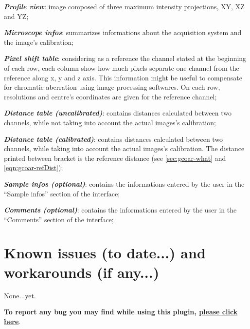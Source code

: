 \documentclass[a4paper, 11pt]{report}%
\makeatletter
\newcommand{\mailbug}{\begin{center}\textbf{To report any bug you may find while using this plugin, \href{mailto:fabrice.cordelieres@gmail.com,cedric.matthews@ibdml.univ-mrs.fr ?subject=Bug\%20found\%20in\%20MetroloJ&body=\%0ABug\%20description:\%0A\%0AHow\%20did\%20it\%20happen:\%0A\%0ACopy/Paste\%20the\%20content\%20of\%20the\%20log\%20window\%0A\%0AVersion\%20of\%20ImageJ:\%0A\%0AVersion\%20of\%20Java:}{please click here}}.\end{center}}
\makeatother
\begin{document}
\begin{itemize*}
	\item \textbf{\textit{Profile view}}: image composed of three maximum intensity projections, XY, XZ and YZ;
	\item \textbf{\textit{Microscope infos}}: summarizes informations about the acquisition system and the image's calibration;
	\item \textbf{\textit{Pixel shift table}}: considering as a reference the channel stated at the beginning of each row, each column show how much pixels separate one channel from the reference along x, y and z axis. This information might be useful to compensate for chromatic aberration using image processing softwares. On each row, resolutions and centre's coordinates are given for the reference channel;
	\item \textbf{\textit{Distance table (uncalibrated)}}: contains distances calculated between two channels, while not taking into account the actual images's calibration;
	\item \textbf{\textit{Distance table (calibrated)}}: contains distances calculated between two channels, while taking into account the actual images's calibration. The distance printed between bracket is the reference distance (see \ref{sec:gcoar-what} and \ref{eqn:gcoar-refDist});
	\item \textbf{\textit{Sample infos (optional)}}: contains the informations entered by the user in the ``Sample infos'' section of the interface;
	\item \textbf{\textit{Comments (optional)}}: contains the informations entered by the user in the ``Comments'' section of the interface;
\end{itemize*}

\section{Known issues (to date...) and workarounds (if any...)}
\label{sec:gcoar-ki}

None...yet.

\mailbug
\end{document}
